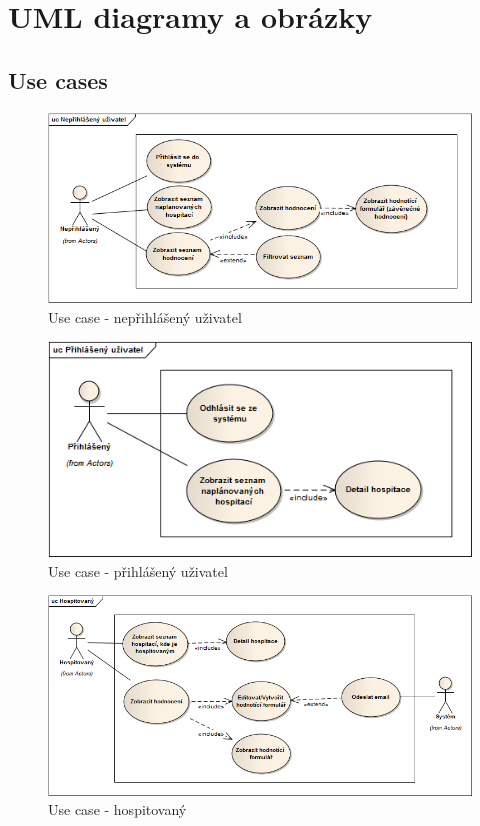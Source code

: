 \chapter{UML diagramy a obrázky}
\section{Use cases}
\label{use_cases}

\begin{figure}[H]
\begin{center}
\includegraphics[width=12cm]{figures/actor_base}
\caption{Use case - nepřihlášený uživatel}
\label{fig:actor_base}
\end{center}
\end{figure}

\begin{figure}[H]
\begin{center}
\includegraphics[width=12cm]{figures/actor_logged}
\caption{Use case - přihlášený uživatel}
\label{fig:actor_logged}
\end{center}
\end{figure}

\begin{figure}[H]
\begin{center}
\includegraphics[width=12cm]{figures/actor_observed}
\caption{Use case - hospitovaný}
\label{fig:actor_observed}
\end{center}
\end{figure}

